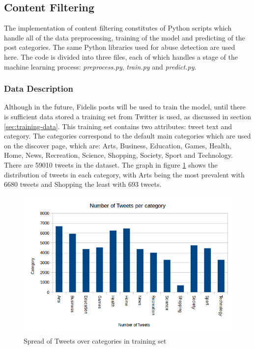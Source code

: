 \subsection{Content Filtering}
The implementation of content filtering constitutes of Python scripts which handle all of the data preprocessing, training of the model and predicting of the post categories. The same Python libraries used for abuse detection are used here. The code is divided into three files, each of which handles a stage of the machine learning process: \emph{preprocess.py}, \emph{train.py} and \emph{predict.py}.

\subsubsection{Data Description}
Although in the future, Fidelis posts will be used to train the model, until there is sufficient data stored a training set from Twitter is used, as discussed in section \ref{sec:training-data}. This training set contains two attributes: tweet text and category. The categories correspond to the default main categories which are used on the discover page, which are: Arts, Business, Education, Games, Health, Home, News, Recreation, Science, Shopping, Society, Sport and Technology. There are 59010 tweets in the dataset. The graph in figure \ref{fig:category-spread} shows the distribution of tweets in each category, with Arts being the most prevalent with 6680 tweets and Shopping the least with 693 tweets.

\begin{figure}[H]
\centering
\includegraphics[width=\textwidth]{Images/Implementation/category-spread}
\caption{Spread of Tweets over categories in training set}
\label{fig:category-spread}
\end{figure}

